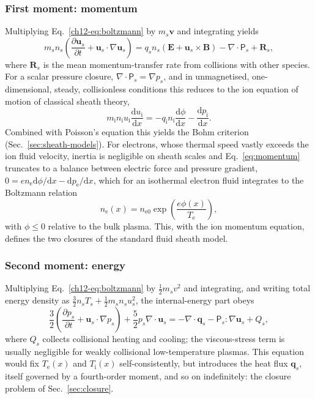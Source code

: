 \subsubsection{First moment: momentum}

Multiplying Eq.~\eqref{ch12-eq:boltzmann} by $m_s\mathbf{v}$ and integrating yields
\begin{equation}
m_s n_s\left(\frac{\partial \mathbf{u}_s}{\partial t} + \mathbf{u}_s\cdot\nabla\mathbf{u}_s\right) = q_s n_s\left(\mathbf{E}+\mathbf{u}_s\times\mathbf{B}\right) - \nabla\cdot\mathsf{P}_s + \mathbf{R}_s,
\label{eq:momentum}
\end{equation}
where $\mathbf{R}_s$ is the mean momentum-transfer rate from collisions with other species. For a scalar pressure closure, $\nabla\cdot\mathsf{P}_s = \nabla p_s$, and in unmagnetised, one-dimensional, steady, collisionless conditions this reduces to the ion equation of motion of classical sheath theory,
\begin{equation}
m_{\mathrm{i}} n_{\mathrm{i}} u_{\mathrm{i}}\frac{\mathrm{d}u_{\mathrm{i}}}{\mathrm{d}x} = -q_{\mathrm{i}} n_{\mathrm{i}}\frac{\mathrm{d}\phi}{\mathrm{d}x} - \frac{\mathrm{d}p_{\mathrm{i}}}{\mathrm{d}x}.
\label{eq:ion-momentum-1d}
\end{equation}
Combined with Poisson's equation this yields the Bohm criterion (Sec.~\ref{sec:sheath-models}). For electrons, whose thermal speed vastly exceeds the ion fluid velocity, inertia is negligible on sheath scales and Eq.~\eqref{eq:momentum} truncates to a balance between electric force and pressure gradient, $0 = e n_{\mathrm{e}} \mathrm{d}\phi/\mathrm{d}x - \mathrm{d}p_{\mathrm{e}}/\mathrm{d}x$, which for an isothermal electron fluid integrates to the Boltzmann relation
\begin{equation}
n_{\mathrm{e}}(x) = n_{\mathrm{e}0}\exp\!\left(\frac{e\phi(x)}{T_{\mathrm{e}}}\right),
\label{eq:boltzmann-electrons}
\end{equation}
with $\phi\le0$ relative to the bulk plasma. This, with the ion momentum equation, defines the two closures of the standard fluid sheath model.

\subsubsection{Second moment: energy}

Multiplying Eq.~\eqref{ch12-eq:boltzmann} by $\tfrac{1}{2}m_s v^2$ and integrating, and writing total energy density as $\tfrac{3}{2}n_sT_s + \tfrac{1}{2}m_sn_su_s^2$, the internal-energy part obeys
\begin{equation}
\frac{3}{2}\left(\frac{\partial p_s}{\partial t} + \mathbf{u}_s\cdot\nabla p_s\right) + \frac{5}{2}p_s\nabla\cdot\mathbf{u}_s = -\nabla\cdot\mathbf{q}_s - \mathsf{P}_s:\nabla\mathbf{u}_s + Q_s,
\label{eq:energy}
\end{equation}
where $Q_s$ collects collisional heating and cooling; the viscous-stress term is usually negligible for weakly collisional low-temperature plasmas. This equation would fix $T_{\mathrm{e}}(x)$ and $T_{\mathrm{i}}(x)$ self-consistently, but introduces the heat flux $\mathbf{q}_s$, itself governed by a fourth-order moment, and so on indefinitely: the closure problem of Sec.~\ref{sec:closure}.

